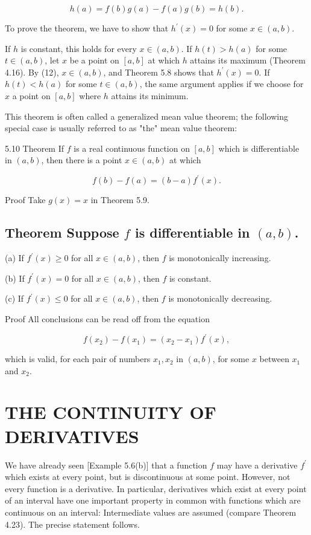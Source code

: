 \documentclass[10pt]{article}
\begin{document}
$$
h(a)=f(b) g(a)-f(a) g(b)=h(b) .
$$

To prove the theorem, we have to show that $h^{\prime}(x)=0$ for some $x \in(a, b)$.

If $h$ is constant, this holds for every $x \in(a, b)$. If $h(t)>h(a)$ for some $t \in(a, b)$, let $x$ be a point on $[a, b]$ at which $h$ attains its maximum (Theorem 4.16). By (12), $x \in(a, b)$, and Theorem 5.8 shows that $h^{\prime}(x)=0$. If $h(t)<h(a)$ for some $t \in(a, b)$, the same argument applies if we choose for $x$ a point on $[a, b]$ where $h$ attains its minimum.

This theorem is often called a generalized mean value theorem; the following special case is usually referred to as "the" mean value theorem:

5.10 Theorem If $f$ is a real continuous function on $[a, b]$ which is differentiable in $(a, b)$, then there is a point $x \in(a, b)$ at which

$$
f(b)-f(a)=(b-a) f^{\prime}(x) .
$$

Proof Take $g(x)=x$ in Theorem 5.9.

\subsection{Theorem Suppose $f$ is differentiable in $(a, b)$.}
(a) If $f^{\prime}(x) \geq 0$ for all $x \in(a, b)$, then $f$ is monotonically increasing.

(b) If $f^{\prime}(x)=0$ for all $x \in(a, b)$, then $f$ is constant.

(c) If $f^{\prime}(x) \leq 0$ for all $x \in(a, b)$, then $f$ is monotonically decreasing.

Proof All conclusions can be read off from the equation

$$
f\left(x_{2}\right)-f\left(x_{1}\right)=\left(x_{2}-x_{1}\right) f^{\prime}(x),
$$

which is valid, for each pair of numbers $x_{1}, x_{2}$ in $(a, b)$, for some $x$ between $x_{1}$ and $x_{2}$.

\section{THE CONTINUITY OF DERIVATIVES}
We have already seen [Example 5.6(b)] that a function $f$ may have a derivative $f^{\prime}$ which exists at every point, but is discontinuous at some point. However, not every function is a derivative. In particular, derivatives which exist at every point of an interval have one important property in common with functions which are continuous on an interval: Intermediate values are assumed (compare Theorem 4.23). The precise statement follows.
\end{document}

